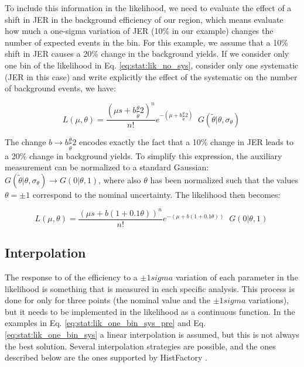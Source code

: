 To include this information in the likelihood, we need to evaluate the effect of a shift in JER in the background efficiency of our region, which means evaluate how much a one-sigma variation of JER (10\% in our example) changes the number of expected events in the bin. 
For this example, we assume that a 10\% shift in JER causes a 20\% change in the background yields.
If we consider only one bin of the likelihood in Eq. \ref{eq:stat:lik_no_sys}, consider only one systematic (JER in this case) and write explicitly the effect of the systematic on the number of background events, we have:

\begin{equation}
\label{eq:stat:lik_one_bin_sys_pre}
L(\mu, \theta) =
\frac{ (\mu s +
b\frac{\theta}{\tilde{\theta}}2 )^{n} }{ n! }
e^{- (\mu  + b\frac{\theta}{\tilde{\theta} }2)}   \;\;
G( \tilde{\theta} | \theta, \sigma_\theta) \ 
\end{equation}

\noindent The change $b \rightarrow b\frac{\theta}{\tilde{\theta} }2$ encodes exactly the fact that a 10\% change in JER leads to a 20\% change in background yields. To simplify this expression, the auxiliary measurement can be normalized to a standard Gaussian: $G( \tilde{\theta} | \theta, \sigma_\theta) \rightarrow G( 0 | \theta, 1)$, where also $\theta$ has been normalized such that the values $\theta = \pm 1$ correspond to the nominal uncertainty. The likelihood then becomes:


\begin{equation}
\label{eq:stat:lik_one_bin_sys}
L(\mu, \theta) =
\frac{ (\mu s +
b(1 + 0.1\theta) )^{n} }{ n! }
e^{- (\mu  + b (1 + 0.1\theta) )}   \;\;
G( 0 | \theta, 1) \ 
\end{equation}

\subsection*{Interpolation}

The response to of the efficiency to a $\pm 1 sigma$ variation of each parameter in the likelihood is something that is measured in each specific analysis. This process is done for only for three points (the nominal value and the $\pm 1 sigma$ variations), but it needs to be implemented in the likelihood as a continuous function. In the examples in Eq. \ref{eq:stat:lik_one_bin_sys_pre} and Eq. \ref{eq:stat:lik_one_bin_sys} a linear interpolation is assumed, but this is not always the best solution. Several interpolation strategies are possible, and the ones described below are the ones supported by HistFactory \cite{Cranmer:1456844}.
 

